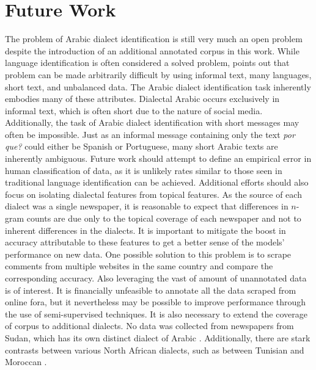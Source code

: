 \documentclass[10pt, a4paper]{article}
\begin{document}
\section{Future Work} The problem of Arabic dialect identification is
still very much an open problem despite the introduction of an
additional annotated corpus in this work. While language identification is often
considered a solved problem,  points out
that problem can be made arbitrarily difficult by using informal text,
many languages, short text, and unbalanced data. The Arabic dialect
identification
task inherently embodies many of these attributes. Dialectal Arabic
occurs exclusively in informal text, which is often short due to the
nature of social media. Additionally, the task of Arabic dialect
identification with short messages may often be impossible. Just as an
informal message containing only the text \textit{por que?} could
either be Spanish or Portuguese, many short Arabic texts are
inherently ambiguous. Future work should attempt to define an
empirical error in human classification of data, as it is unlikely
rates similar to those seen in traditional language identification can be achieved. 
Additional efforts should also focus on isolating dialectal features from topical
features. As the source of each dialect was a single newspaper, it is
reasonable to expect that differences in $n$-gram counts are due only to
the topical coverage of each newspaper and not to inherent
differences in the dialects. It is important to mitigate the boost in accuracy attributable
to these features to get a better sense of the models' performance on
new data. One possible solution to this problem is to scrape comments
from multiple websites in the same country and compare the
corresponding accuracy. Also leveraging the vast of amount of
unannotated data is of interest. It is financially unfeasible to
annotate all the data scraped from online fora, but it nevertheless
may be possible to improve performance through the use of
semi-supervised techniques. It is also necessary to extend the
coverage of corpus to additional dialects. No data was collected from
newspapers from Sudan, which has its own distinct dialect of Arabic
\cite{comrie2013major}. Additionally, there are stark contrasts
between various North African dialects, such as between Tunisian and
Moroccan \cite{comrie2013major}.



\end{document}
